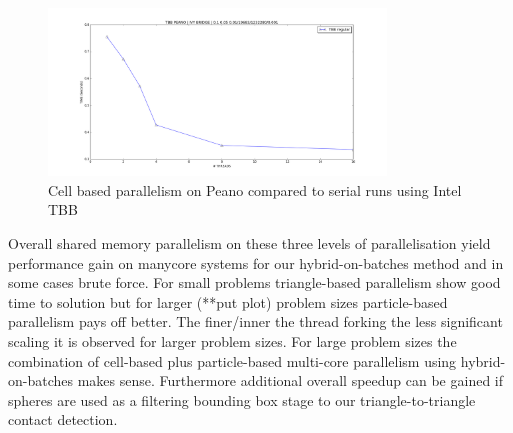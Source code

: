 \begin{figure}[htb]
  \begin{center}
    \includegraphics[width=0.8\textwidth]{experiments/random/omp/tbb_regular_x2.png}
  \end{center}
  \caption{Cell based parallelism on Peano compared to serial runs using Intel TBB}
  \label{figure:tbb_scaling}
\end{figure}

Overall shared memory parallelism on these three levels of parallelisation yield performance gain on manycore systems for our hybrid-on-batches method and in some cases brute force. For small problems triangle-based parallelism show good time to solution but for larger (**put plot) problem sizes particle-based parallelism pays off better. The finer/inner the thread forking the less significant scaling it is observed for larger problem sizes. For large problem sizes the combination of cell-based plus particle-based multi-core parallelism using hybrid-on-batches makes sense. Furthermore additional overall speedup can be gained if spheres are used as a filtering bounding box stage to our triangle-to-triangle contact detection.

\clearpage

